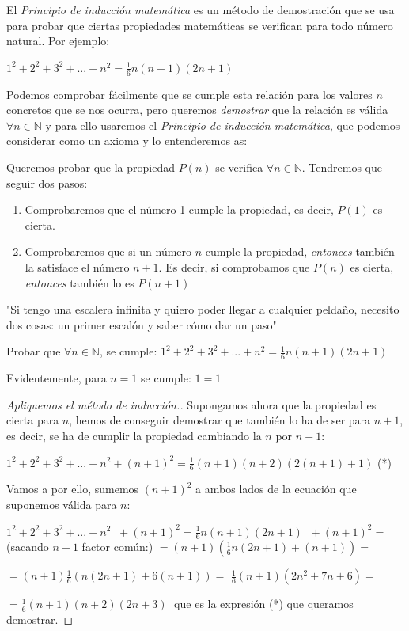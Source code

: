 		
		El \emph{Principio de inducción matemática} es un método de demostración que se usa para probar que ciertas propiedades matemáticas se verifican para todo número natural. Por ejemplo:
		
		$1^2+2^2+3^2+...+n^2=\frac 1 6 n (n+1)(2n+1)$
		
		Podemos comprobar fácilmente que se cumple esta relación para los valores $n$ concretos que se nos ocurra, pero queremos \emph{demostrar} que la relación es válida $\forall n\in \mathbb N$ y para ello usaremos el \emph{Principio de inducción matemática}, que podemos considerar como un axioma y lo entenderemos as:
		
		\begin{axio} Queremos probar que la propiedad $P(n)$ se verifica $\forall n\in \mathbb N$. Tendremos que seguir dos pasos:
			\begin{enumerate}
				\item Comprobaremos que el número 1 cumple la propiedad, es decir, $P(1)$ es cierta.
				\item Comprobaremos que si un número $n$ cumple la propiedad, \emph{entonces} también la satisface el número $n+1$. Es decir, si comprobamos que $P(n)$ es cierta, \emph{entonces} también lo es $P(n+1)$
			\end{enumerate}
			
			"Si tengo una escalera infinita y quiero poder llegar a cualquier peldaño, necesito dos cosas: un primer escalón y saber cómo dar un paso"
		\end{axio}

		
		\begin{ejem} \label{sum-cuad-induc}
		Probar que $\forall n\in \mathbb N$, se cumple:
		$1^2+2^2+3^2+...+n^2=\frac 1 6 n (n+1)(2n+1)$	
		\end{ejem}
		 Evidentemente, para $n=1$ se cumple: $1=1$
		
		\begin{proof}[Apliquemos el método de inducción.]
			
		Supongamos ahora que la propiedad es cierta para $n$, hemos de conseguir demostrar que también lo ha de ser para $n+1$, es decir, se ha de cumplir la propiedad cambiando la $n$ por $n+1$:
		
		$1^2+2^2+3^2+...+n^2+(n+1)^2=\frac 1 6 (n+1) (n+2)(2(n+1)+1)$ (*)
		
		Vamos a por ello, sumemos $(n+1)^2$ a ambos lados de la ecuación que suponemos válida para $n$:
		
		
		$1^2+2^2+3^2+...+n^2\; \; +(n+1)^2=\frac 1 6 n (n+1)(2n+1)\; \; +(n+1)^2=$
		(sacando $n+1$ factor común:)
		$=(n+1) \left( \frac 1 6 n (2n+1) +(n+1) \right)=$
		
		$=(n+1)\frac 1 6 \left(  n (2n+1) + 6(n+1) \right)=$
		$\frac 1 6 (n+1) (2n^2+7n+6)=$
		
		$=\frac 1 6 (n+1) (n+2) (2n+3)\; $ que es la expresión (*) que queramos demostrar.%
		\end{proof}
		
